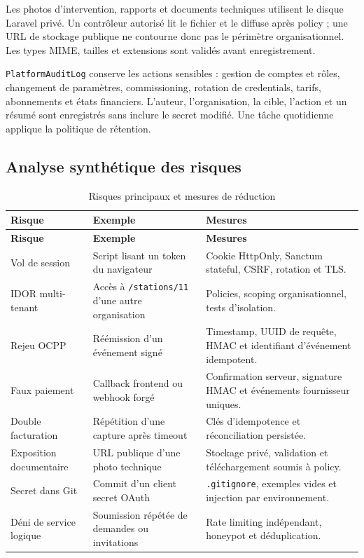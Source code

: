 Les photos d'intervention, rapports et documents techniques utilisent le disque
Laravel privé. Un contrôleur autorisé lit le fichier et le diffuse après policy ;
une URL de stockage publique ne contourne donc pas le périmètre organisationnel. Les
types MIME, tailles et extensions sont validés avant enregistrement.

\texttt{PlatformAuditLog} conserve les actions sensibles : gestion de comptes et
rôles, changement de paramètres, commissioning, rotation de credentials, tarifs,
abonnements et états financiers. L'auteur, l'organisation, la cible, l'action et un
résumé sont enregistrés sans inclure le secret modifié. Une tâche quotidienne
applique la politique de rétention.

\subsection{Analyse synthétique des risques}

\begin{longtable}{|p{3.2cm}|p{4.4cm}|p{6.6cm}|}
  \caption{Risques principaux et mesures de réduction}
  \label{tab:security-risk-summary}\\
  \hline
  \textbf{Risque} & \textbf{Exemple} & \textbf{Mesures}\\
  \hline
  \endfirsthead
  \hline
  \textbf{Risque} & \textbf{Exemple} & \textbf{Mesures}\\
  \hline
  \endhead
  Vol de session & Script lisant un token du navigateur &
  Cookie HttpOnly, Sanctum stateful, CSRF, rotation et TLS.\\\hline
  IDOR multi-tenant & Accès à \texttt{/stations/11} d'une autre organisation &
  Policies, scoping organisationnel, tests d'isolation.\\\hline
  Rejeu OCPP & Réémission d'un événement signé &
  Timestamp, UUID de requête, HMAC et identifiant d'événement idempotent.\\\hline
  Faux paiement & Callback frontend ou webhook forgé &
  Confirmation serveur, signature HMAC et événements fournisseur uniques.\\\hline
  Double facturation & Répétition d'une capture après timeout &
  Clés d'idempotence et réconciliation persistée.\\\hline
  Exposition documentaire & URL publique d'une photo technique &
  Stockage privé, validation et téléchargement soumis à policy.\\\hline
  Secret dans Git & Commit d'un client secret OAuth &
  \texttt{.gitignore}, exemples vides et injection par environnement.\\\hline
  Déni de service logique & Soumission répétée de demandes ou invitations &
  Rate limiting indépendant, honeypot et déduplication.\\
  \hline
\end{longtable}

